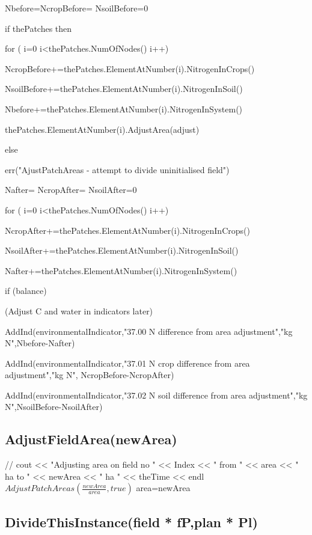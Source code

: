 \documentclass[%
]{scrartcl}
\begin{document}
   Nbefore=NcropBefore= NsoilBefore=0

	if thePatches then
   
 \quad  	for ( i=0 i<thePatches.NumOfNodes() i++)
      
 \quad   \quad     NcropBefore+=thePatches.ElementAtNumber(i).NitrogenInCrops()
    
\quad     \quad    NsoilBefore+=thePatches.ElementAtNumber(i).NitrogenInSoil()
 
 \quad  \quad      Nbefore+=thePatches.ElementAtNumber(i).NitrogenInSystem()
  
  \quad 	\quad	 thePatches.ElementAtNumber(i).AdjustArea(adjust)
      
  
   else
   
  \quad    err("AjustPatchAreas - attempt to divide uninitialised field")

   Nafter=
   NcropAfter=
   NsoilAfter=0
   
   for ( i=0 i<thePatches.NumOfNodes() i++)
   
   \quad   NcropAfter+=thePatches.ElementAtNumber(i).NitrogenInCrops()

 \quad     NsoilAfter+=thePatches.ElementAtNumber(i).NitrogenInSoil()

 \quad     Nafter+=thePatches.ElementAtNumber(i).NitrogenInSystem()
   

   if (balance)
   
   \quad   (Adjust C and water in indicators later)
 
  \quad    AddInd(environmentalIndicator,"37.00 N difference from area adjustment","kg N",Nbefore-Nafter)

   \quad   AddInd(environmentalIndicator,"37.01 N crop difference from area adjustment","kg N",
NcropBefore-NcropAfter)

\quad      AddInd(environmentalIndicator,"37.02 N soil difference from area adjustment","kg N",NsoilBefore-NsoilAfter)
  

\subsection{AdjustFieldArea(newArea)}   // cout << "Adjusting area on field no " << Index << " from " << area << " ha to " << newArea << " ha " << theTime << endl
$   AdjustPatchAreas(\tfrac{newArea}{area},true)$
   area=newArea


\subsection{DivideThisInstance(field * fP,plan * Pl)}
\end{document}
